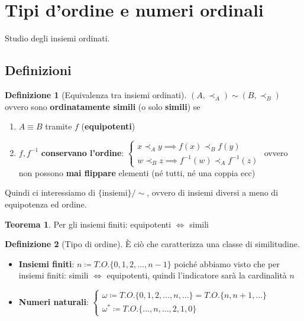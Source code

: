 \documentclass[a4paper,10pt]{article}
\theoremstyle{definition}
\theoremstyle{indentdefinition}
\newtheorem{defn}{Definizione}[section]
\theoremstyle{indentpostulate}
\theoremstyle{indenttheorem}
\newtheorem{thm}{Teorema}[section]
\theoremstyle{myremark}
\theoremstyle{indentgeneral}
\begin{document}
\pagebreak{}
\section{Tipi d’ordine e numeri ordinali}
Studio degli insiemi ordinati.
\subsection{Definizioni}

\begin{defn}[Equivalenza tra insiemi ordinati]
    $(A,\prec_A)\sim(B,\prec_B)$ ovvero  sono \textbf{ordinatamente simili} (o solo \textbf{simili}) se 
    \begin{enumerate}
        \item $A\equiv B$ tramite $f$ (\textbf{equipotenti})
        \item $f,f^{-1}$ \textbf{conservano l'ordine}: $\begin{cases}
            x\prec_A y\implies f(x)\prec_Bf(y)\\
            w\prec_B z\implies f^{-1}(w)\prec_Af^{-1}(z)
        \end{cases}$ ovvero non possono \textbf{mai flippare} elementi (né tutti, né una coppia ecc)
    \end{enumerate}
    Quindi ci interessiamo di $\{\text{insiemi}\}/\sim$, ovvero di insiemi diversi a meno di equipotenza ed ordine.
\end{defn}

\begin{thm}
    Per gli insiemi finiti: equipotenti $\iff$ simili
\end{thm}

\begin{defn}[Tipo di ordine]
    È ciò che caratterizza una classe di similitudine.
    \begin{itemize}
        \item \textbf{Insiemi finiti}: $n\coloneqq T.O.\{0,1,2,\dots,n-1\}$ poiché abbiamo visto che per insiemi finiti: simili $\iff$ equipotenti, quindi l'indicatore sarà la cardinalità $n$
        \item \textbf{Numeri naturali}: $\begin{cases}
            \omega\coloneqq T.O.\{0,1,2,\dots,n,\dots\}=T.O.\{n,n+1,\dots\}\\
            \omega^*\coloneqq T.O.\{\dots,n,\dots,2,1,0\}
            \end{cases}$ 
    \end{itemize}
\end{defn}
\end{document}

